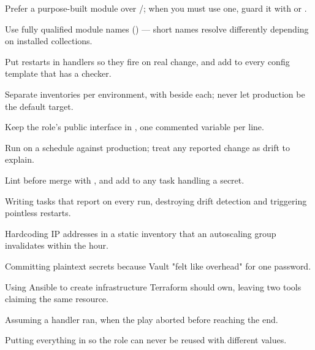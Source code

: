 \begin{bestpractices}
\begin{wbitem}
  \item Prefer a purpose-built module over /; when you must use one, guard it with  or .
  \item Use fully qualified module names () --- short names resolve differently depending on installed collections.
  \item Put restarts in handlers so they fire on real change, and add  to every config template that has a checker.
  \item Separate inventories per environment, with  beside each; never let production be the default target.
  \item Keep the role's public interface in , one commented variable per line.
  \item Run  on a schedule against production; treat any reported change as drift to explain.
  \item Lint before merge with , and add  to any task handling a secret.
\end{wbitem}
\end{bestpractices}
\begin{mistakes}
\begin{wbitem}
  \item Writing tasks that report  on every run, destroying drift detection and triggering pointless restarts.
  \item Hardcoding IP addresses in a static inventory that an autoscaling group invalidates within the hour.
  \item Committing plaintext secrets because Vault "felt like overhead" for one password.
  \item Using Ansible to create infrastructure Terraform should own, leaving two tools claiming the same resource.
  \item Assuming a handler ran, when the play aborted before reaching the end.
  \item Putting everything in  so the role can never be reused with different values.
\end{wbitem}
\end{mistakes}


